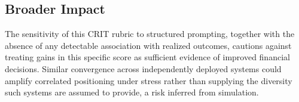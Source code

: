 \documentclass{article}
\begin{document}
\vspace{-6pt}
\subsection{Broader Impact}
\vspace{-6pt}
The sensitivity of this CRIT rubric to structured prompting, together with the absence of any detectable association with realized outcomes, cautions against treating gains in this specific score as sufficient evidence of improved financial decisions. Similar convergence across independently deployed systems could amplify correlated positioning under stress rather than supplying the diversity such systems are assumed to provide, a risk inferred from simulation.



\end{document}

